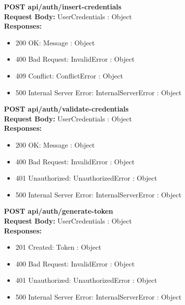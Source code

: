 \noindent\textbf{\color{titleColor}POST api/auth/insert-credentials}
\vspace{2pt}
\\\textbf{\color{titleColor}Request Body:} UserCredentials : Object 
\vspace{4pt}
\\\textbf{\color{titleColor}Responses:} 
\begin{itemize}
    \item {\color{titleColor}200 OK:} Message : Object
    \item {\color{titleColor}400 Bad Request:} InvalidError : Object
    \item {\color{titleColor}409 Conflict:} ConflictError : Object
    \item {\color{titleColor}500 Internal Server Error:} InternalServerError : Object
\end{itemize}
\vspace{10pt}
\noindent{\color{titleColor}\rule{0.8\linewidth}{0.2mm}}
\vspace{10pt}

\noindent\textbf{\color{titleColor}POST api/auth/validate-credentials}
\vspace{2pt}
\\\textbf{\color{titleColor}Request Body:} UserCredentials : Object 
\vspace{4pt}
\\\textbf{\color{titleColor}Responses:} 
\begin{itemize}
    \item {\color{titleColor}200 OK:} Message : Object
    \item {\color{titleColor}400 Bad Request:} InvalidError : Object
    \item {\color{titleColor}401 Unauthorized:} UnauthorizedError : Object
    \item {\color{titleColor}500 Internal Server Error:} InternalServerError : Object
\end{itemize}
\vspace{10pt}
\noindent{\color{titleColor}\rule{0.8\linewidth}{0.2mm}}
\vspace{10pt}

\noindent\textbf{\color{titleColor}POST api/auth/generate-token}
\vspace{2pt}
\\\textbf{\color{titleColor}Request Body:} UserCredentials : Object 
\vspace{4pt}
\\\textbf{\color{titleColor}Responses:} 
\begin{itemize}
    \item {\color{titleColor}201 Created:} Token : Object
    \item {\color{titleColor}400 Bad Request:} InvalidError : Object
    \item {\color{titleColor}401 Unauthorized:} UnauthorizedError : Object
    \item {\color{titleColor}500 Internal Server Error:} InternalServerError : Object
\end{itemize}
\vspace{10pt}
\noindent{\color{titleColor}\rule{0.8\linewidth}{0.2mm}}
\vspace{10pt}

